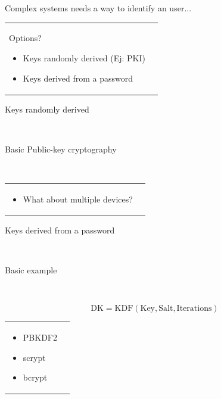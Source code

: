 \documentclass[12pt]{beamer}
\renewcommand{\frametitle}[1]{\vspace{0.2cm}\begin{huge}#1\end{huge}}
\renewcommand{\framesubtitle}[1]{\\ \vspace{0.4cm} \hspace{0.4cm}\begin{large}#1\end{large}}
\begin{document}
  \begin{frame}
  \frametitle{Complex systems needs a way to identify an user...}
  \begin{table}
  \begin{tabular}{p{7cm}p{3cm}}
  \framesubtitle{Options?}
  \begin{itemize}
    \item Keys randomly derived (Ej: PKI)
    \item Keys derived from a password
  \end{itemize}
  &
  \vspace{1.5cm}
  \end{tabular}
  \end{table}
  \end{frame}

  \begin{frame}
  \frametitle{Keys randomly derived}
  \framesubtitle{Basic Public-key cryptography}
  \\
  \begin{table}
  \begin{tabular}{p{7cm}p{3cm}}
  \begin{itemize}
    \item What about multiple devices?
  \end{itemize}
  &
  \vspace{1.5cm}
  \end{tabular}
  \end{table}
  \end{frame}

  \begin{frame}
  \frametitle{Keys derived from a password}
  \framesubtitle{Basic example}
  \framesubtitle{}
  $$ \text{DK}=\text{KDF}(\text{Key}, \text{Salt}, \text{Iterations}) $$
  \begin{table}
  \begin{tabular}{p{7cm}p{3cm}}
  \begin{itemize}
    \item PBKDF2
    \item scrypt
    \item bcrypt
  \end{itemize}
  &
  \vspace{1.5cm}
  \end{tabular}
  \end{table}
  \end{frame}
\end{document}
